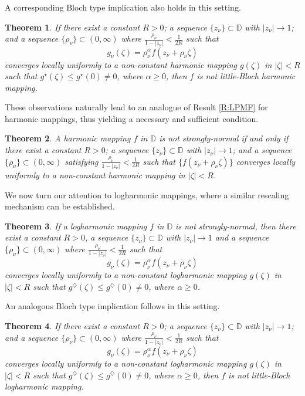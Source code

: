 \documentclass[10pt,a4paper]{amsart}
\newtheorem{theorem}{Theorem}[section]
\numberwithin{equation}{section}
\begin{document}
A corresponding Bloch type implication also holds in this setting.
\begin{theorem} \label{T:CPZPSNHMF}  
    If there exist a constant $R>0$; a sequence $\{z_{\nu}\}\subset \mathbb D$ with 
    $|z_{\nu}|\to1$; and a sequence $\{\rho_{\nu} \}\subset (0,\infty)$ where $\displaystyle\frac{\rho_{\nu} }{1-|z_{\nu}|}<\frac{1}{2R}$ such that \begin{equation*}g_{\nu}(\zeta)=\rho_{\nu} ^{\alpha}f(z_{\nu}+\rho_{\nu} \zeta)\end{equation*}
    converges locally uniformly to a non-constant harmonic mapping $g(\zeta)$ in $|\zeta|<R$ such 
    that $g^\star(\zeta)\le g^\star(0)\neq 0$, where $\alpha\geq 0$, then $f$ is not little-Bloch harmonic mapping.
\end{theorem}  These observations naturally lead to an analogue of Result \ref{R:LPMF} for harmonic 
mappings, thus yielding a necessary and sufficient condition.
\begin{theorem} \label{T:LPSNHM}
A harmonic mapping $f$ in $\mathbb{D}$ is not strongly-normal
if and only if there exist a constant $R>0$; a 
sequence $\{z_{\nu}\}\subset \mathbb{D}$ with $|z_{\nu}|\to1$; and a sequence $\{\rho_{\nu} \}\subset(0,\infty)$ satisfying 
$\displaystyle\frac{\rho_{\nu} }{1-|z_{\nu}|}<\frac{1}{2R}$ such that $\{f(z_{\nu}+\rho_{\nu} \zeta)\}$ converges locally uniformly to a non-constant harmonic mapping in $|\zeta|<R$.
\end{theorem}
We now turn our attention to logharmonic mappings, where a similar rescaling mechanism can be established.
\begin{theorem} \label{T:FPZPSNLHMF}
    If a logharmonic mapping $f$ in $\mathbb D$ is not strongly-normal, then there exist a constant $R>0$, a sequence $\{z_{\nu}\}\subset \mathbb D$
    with $|z_{\nu}|\to1$ and a sequence $\{\rho_{\nu} \}\subset (0,\infty)$ where $\displaystyle\frac{\rho_{\nu} }{1-|z_{\nu}|}<\frac{1}{2R}$ such that \begin{equation*}g_{\nu}(\zeta)=\rho_{\nu} ^{\alpha}f(z_{\nu}+\rho_{\nu} \zeta)\end{equation*}
    converges locally uniformly to a non-constant logharmonic mapping $g(\zeta)$ in $|\zeta|<R$ 
    such that $g^\diamondsuit(\zeta)\le g^\diamondsuit(0)\neq0$, where $\alpha\geq 0$.
\end{theorem}
An analogous Bloch type implication follows in this setting.
\begin{theorem} \label{T:CPZPSNLHMF}
    If there exist a constant $R>0$; a sequence $\{z_{\nu}\}\subset \mathbb D$ with 
    $|z_{\nu}|\to1$; and a sequence $\{\rho_{\nu} \}\subset (0,\infty)$ where 
    $\displaystyle\frac{\rho_{\nu} }{1-|z_{\nu}|}<\frac{1}{2R}$ such that \begin{equation*}g_{\nu}(\zeta)=\rho_{\nu} ^{\alpha}f(z_{\nu}+\rho_{\nu} \zeta)\end{equation*}
    converges locally uniformly to a non-constant logharmonic mapping $g(\zeta)$ in $|\zeta|<R$ 
    such that $g^\diamondsuit(\zeta)\le g^\diamondsuit(0)\neq0$, where $\alpha\geq 0$, then $f$ is not little-Bloch logharmonic mapping.
\end{theorem}
\end{document}

